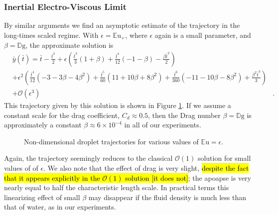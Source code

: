 \documentclass[a4paper, 12pt]{article}
\begin{document}
\subsubsection{Inertial Electro-Viscous Limit}

By similar arguments we find an asymptotic estimate of the trajectory in the long-times scaled regime. With $\epsilon = {\mathbb{E}\mbox{u}}_+$, where $\epsilon$ again is a small parameter, and $\beta = \mathbb{D}\mbox{g}$, the approximate solution is 
\begin{eqnarray*}
&\bar{y}(\bar{t}) = \bar{t} - \frac{\bar{t}^{2}}{2} + \epsilon \left(\frac{\bar{t}^{3}}{3} \left(1 + \beta\right) + \frac{\bar{t}^{4}}{12} \left(-1 - \beta\right) - \frac{\beta \bar{t}^{2}}{2}\right)&  \\
&+ \epsilon^{2} \left(\frac{\bar{t}^{4}}{12} \left(-3 - 3 \beta - 4 \beta^{2}\right) + \frac{\bar{t}^{5}}{60} \left(11 + 10 \beta + 8 \beta^{2}\right)+ \frac{\bar{t}^{6}}{360} \left(-11 - 10 \beta - 8 \beta^{2}\right) + \frac{\beta^{2} \bar{t}^{3}}{3}\right)& \\
 &+ \mathcal{O}(\epsilon^3)&.
\end{eqnarray*}
This trajectory given by this solution is shown in Figure \ref{fig:long_times}. If we assume a constant scale for the drag coefficient, $C_d \approx 0.5$, then  the Drag number $\beta = \mathbb{D}\mbox{g}$ is approximately a constant $\beta \approx 6 \times 10^{-4}$ in all of our experiments.
\begin{figure}[htb]
    \centering
    
    \caption{Non-dimensional droplet trajectories for various values of $\mathbb{E}\mbox{u}=\epsilon$.}
     \label{fig:long_times}
\end{figure}
Again, the trajectory seemingly reduces to the classical $\mathcal{O}(1)$ solution for small values of of $\epsilon$. We also note that the effect of drag is very slight, \hl{despite the fact that it appears explicitly in the $\mathcal{O}(1)$ solution [it does not]}; the apoapse is very nearly equal to half the characteristic length scale. In practical terms this linearizing effect of small $\beta$ may disappear if the fluid density is much less than that of water, as in our experiments.
 
\end{document}
